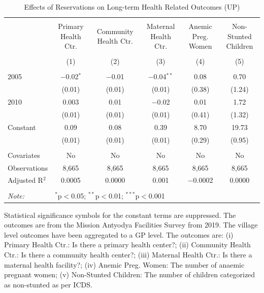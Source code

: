 \begin{table}
\centering
\begin{threeparttable}

  \caption{Effects of Reservations on Long-term Health Related Outcomes (UP)} 
  \label{up_shrug_health_05_10} 
\scriptsize 
\begin{tabular}{@{\extracolsep{0pt}}lccccc} 
\\[-1.8ex]\hline 
\hline \\[-1.8ex] 
 & Primary Health Ctr. & Community Health Ctr. & Maternal Health Ctr. & Anemic Preg. Women & Non-Stunted Children \\ 
\\[-1.8ex] & (1) & (2) & (3) & (4) & (5)\\ 
\hline \\[-1.8ex] 
 2005 & $-$0.02$^{*}$ & $-$0.01 & $-$0.04$^{**}$ & 0.08 & 0.70 \\ 
  & (0.01) & (0.01) & (0.01) & (0.38) & (1.24) \\ 
  2010 & 0.003 & 0.01 & $-$0.02 & 0.01 & 1.72 \\ 
  & (0.01) & (0.01) & (0.01) & (0.41) & (1.32) \\ 
  Constant & 0.09 & 0.08 & 0.39 & 8.70 & 19.73 \\ 
  & (0.01) & (0.01) & (0.01) & (0.29) & (0.95) \\ 
 \hline \\[-1.8ex] 
Covariates & No & No & No & No & No \\ 
Observations & 8,665 & 8,665 & 8,665 & 8,665 & 8,665 \\ 
Adjusted R$^{2}$ & 0.0005 & 0.0000 & 0.001 & $-$0.0002 & 0.0000 \\ 
\hline 
\hline \\[-1.8ex] 
\textit{Note:}  & \multicolumn{5}{l}{$^{*}$p$<$0.05; $^{**}$p$<$0.01; $^{***}$p$<$0.001} \\ 
\end{tabular} 
\begin{tablenotes}[flushleft]
\setlength{\itemindent}{0em}
\scriptsize
\item[] Statistical significance symbols for the constant terms are suppressed. The outcomes are from the Mission Antyodya Facilities Survey from 2019. The village level outcomes have been aggregated to a GP level. The outcomes are:
                    (i) Primary Health Ctr.: Is there a primary health center?;
                    (ii) Community Health Ctr.: Is there a community health center?;
                    (iii) Maternal Health Ctr.: Is there a maternal health facility?;
                    (iv) Anemic Preg. Women: The number of anaemic pregnant women;
                    (v) Non-Stunted Children: The number of children categorized as non-stunted as per ICDS.
\end{tablenotes}
\end{threeparttable}
\end{table}
